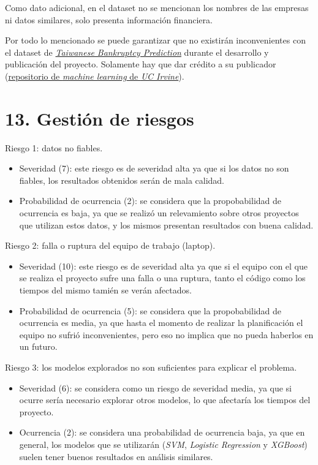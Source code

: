 \documentclass[
11pt, %
]{charter}
\begin{document}
Como dato adicional, en el dataset no se mencionan los nombres de las empresas ni datos similares, solo presenta información financiera.

Por todo lo mencionado se puede garantizar que no existirán inconvenientes con el dataset de \href{https://archive.ics.uci.edu/dataset/572/taiwanese+bankruptcy+prediction}{\textit{Taiwanese Bankruptcy Prediction}} durante el desarrollo y publicación del proyecto. Solamente hay que dar crédito a su publicador (\href{https://archive.ics.uci.edu/}{repositorio de \textit{machine learning} de \textit{UC Irvine}}).

\section{13. Gestión de riesgos}
\label{sec:riesgos}

Riesgo 1: datos no fiables.
\begin{itemize}
	\item Severidad (7): este riesgo es de severidad alta ya que si los datos no son fiables, los resultados obtenidos serán de mala calidad.
	\item Probabilidad de ocurrencia (2): se considera que la propobabilidad de ocurrencia es baja, ya que se realizó un relevamiento sobre otros proyectos que utilizan estos datos, y los mismos presentan resultados con buena calidad.
\end{itemize}   

Riesgo 2: falla o ruptura del equipo de trabajo (laptop).
\begin{itemize}
	\item Severidad (10): este riesgo es de severidad alta ya que si el equipo con el que se realiza el proyecto sufre una falla o una ruptura, tanto el código como los tiempos del mismo tamién se verán afectados.
	\item Probabilidad de ocurrencia (5): se considera que la propobabilidad de ocurrencia es media, ya que hasta el momento de realizar la planificación el equipo no sufrió inconvenientes, pero eso no implica que no pueda haberlos en un futuro.
\end{itemize}   

Riesgo 3: los modelos explorados no son suficientes para explicar el problema.
\begin{itemize}
	\item Severidad (6): se considera como un riesgo de severidad media, ya que si ocurre sería necesario explorar otros modelos, lo que afectaría los tiempos del proyecto.
	\item Ocurrencia (2): se considera una probabilidad de ocurrencia baja, ya que en general, los modelos que se utilizarán (\textit{SVM}, \textit{Logistic Regression} y \textit{XGBoost}) suelen tener buenos resultados en análisis similares.
\end{itemize}
\end{document}
